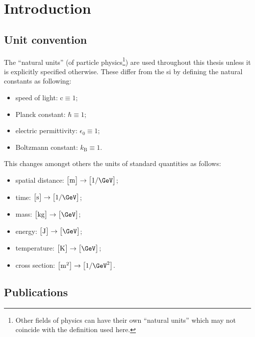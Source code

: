 \chapter{Introduction}

\section{Unit convention}

The ``natural units'' (of particle physics\footnote{Other fields of physics can have their own ``natural units'' which may not coincide with the definition used here.}) are used throughout this thesis unless it is explicitly specified otherwise. These differ from the \gls{si} by defining the natural constants as following:

\begin{itemize}
\item speed of light: $\mathrm{c}\equiv 1$;
\item Planck constant: $\hbar\equiv 1$;
\item electric permittivity: $\epsilon_{0}\equiv 1$;
\item Boltzmann constant: $k_\mathrm{B}\equiv 1$.
\end{itemize}

This changes amongst others the units of standard quantities as follows:

\begin{itemize}
\item spatial distance: $\big[\mathrm{m}\big]\rightarrow \big[1/\GeV\big]$;
\item time: $\big[\mathrm{s}\big]\rightarrow \big[1/\GeV\big]$;
\item mass: $\big[\mathrm{kg}\big]\rightarrow \big[\GeV\big]$;
\item energy: $\big[\mathrm{J}\big]\rightarrow \big[\GeV\big]$;
\item temperature: $\big[\mathrm{K}\big]\rightarrow \big[\GeV\big]$;
\item cross section: $\big[\mathrm{m}^{2}\big]\rightarrow \big[1/\GeV^{2}\big]$.
\end{itemize}


\section{Publications}

